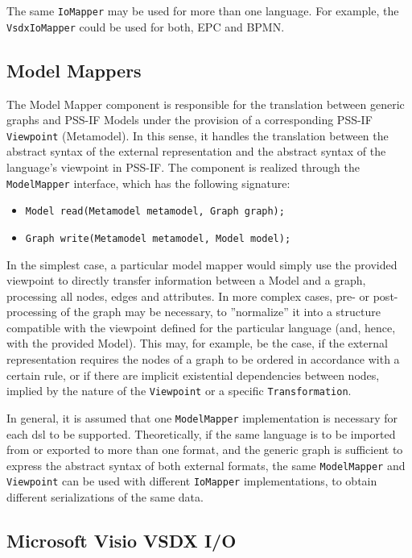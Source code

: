 The same \texttt{IoMapper} may be used for more than one language. For example, the \texttt{VsdxIoMapper} could be used for both, EPC and BPMN.

\subsection{Model Mappers}
\label{sec:impl:comp:model}

The Model Mapper component is responsible for the translation between generic graphs and PSS-IF Models under the provision of a corresponding PSS-IF \texttt{Viewpoint} (Metamodel). In this sense, it handles the translation between the abstract syntax of the external representation and the abstract syntax of the language's viewpoint in PSS-IF. The component is realized through the \texttt{ModelMapper} interface, which has the following signature:

\begin{itemize}
\item \texttt{Model read(Metamodel metamodel, Graph graph);}
\item \texttt{Graph write(Metamodel metamodel, Model model);}
\end{itemize}

In the simplest case, a particular model mapper would simply use the provided viewpoint to directly transfer information between a Model and a graph, processing all nodes, edges and attributes. In more complex cases, pre- or post-processing of the graph may be necessary, to ''normalize'' it into a structure compatible with the viewpoint defined for the particular language (and, hence, with the provided Model). This may, for example, be the case, if the external representation requires the nodes of a graph to be ordered in accordance with a certain rule, or if there are implicit existential dependencies between nodes, implied by the nature of the \texttt{Viewpoint} or a specific \texttt{Transformation}.

In general, it is assumed that one \texttt{ModelMapper} implementation is necessary for each \gls{dsl} to be supported. Theoretically, if the same language is to be imported from or exported to more than one format, and the generic graph is sufficient to express the abstract syntax of both external formats, the same \texttt{ModelMapper} and \texttt{Viewpoint} can be used with different \texttt{IoMapper} implementations, to obtain different serializations of the same data.

\subsection{Microsoft Visio VSDX I/O}

